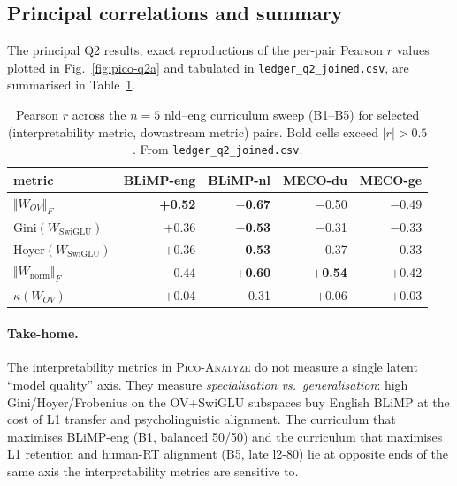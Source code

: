 \subsection{Principal correlations and summary}\label{sec:pico-headline}

The principal Q2 results, exact reproductions of the per-pair Pearson $r$ values plotted in Fig.~\ref{fig:pico-q2a} and tabulated in \texttt{ledger\_q2\_joined.csv}, are summarised in Table~\ref{tab:pico-q2-headline}.

\begin{table}[h]
  \centering
  \small
  \caption{Pearson $r$ across the $n=5$ nld--eng curriculum sweep (B1--B5) for selected (interpretability metric, downstream metric) pairs. Bold cells exceed $|r|>0.5$. From \texttt{ledger\_q2\_joined.csv}.}
  \label{tab:pico-q2-headline}
  \begin{tabular}{lrrrr}
    \toprule
    metric & BLiMP-eng & BLiMP-nl & MECO-du & MECO-ge \\
    \midrule
    $\Vert W_{OV}\Vert_F$       & \textbf{+0.52} & \textbf{$-$0.67} & $-$0.50 & $-$0.49 \\
    Gini$(W_{\text{SwiGLU}})$   & $+$0.36        & \textbf{$-$0.53} & $-$0.31 & $-$0.33 \\
    Hoyer$(W_{\text{SwiGLU}})$  & $+$0.36        & \textbf{$-$0.53} & $-$0.37 & $-$0.33 \\
    $\Vert W_{\text{norm}}\Vert_F$ & $-$0.44     & \textbf{$+$0.60} & \textbf{$+$0.54} & $+$0.42 \\
    $\kappa(W_{OV})$            & $+$0.04        & $-$0.31          & $+$0.06 & $+$0.03 \\
    \bottomrule
  \end{tabular}
\end{table}

\paragraph{Take-home.} The interpretability metrics in \textsc{Pico-Analyze} do not measure a single latent ``model quality'' axis. They measure \emph{specialisation vs.\ generalisation}: high Gini/Hoyer/Frobenius on the OV+SwiGLU subspaces buy English BLiMP at the cost of L1 transfer and psycholinguistic alignment. The curriculum that maximises BLiMP-eng (B1, balanced 50/50) and the curriculum that maximises L1 retention and human-RT alignment (B5, late l2-80) lie at opposite ends of the same axis the interpretability metrics are sensitive to.

